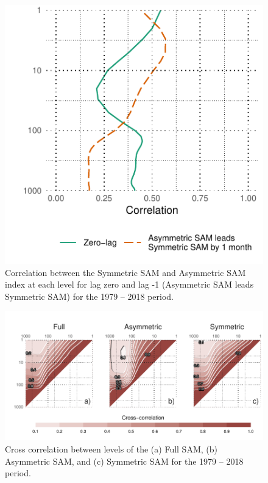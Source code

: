 \documentclass[smallextended]{svjour3}       %
\begin{document}
\begin{figure}
\includegraphics{cor-lev-1} \caption{Correlation between the Symmetric SAM and Asymmetric SAM index at each level for lag zero and lag -1 (Asymmetric SAM leads Symmetric SAM) for the 1979 -- 2018 period.}\label{fig:cor-lev}
\end{figure}

\begin{figure}
\includegraphics{cross-correlation-1} \caption{Cross correlation between levels of the (a) Full SAM, (b) Asymmetric SAM, and (c) Symmetric SAM for the 1979 -- 2018 period.}\label{fig:cross-correlation}
\end{figure}
\end{document}
